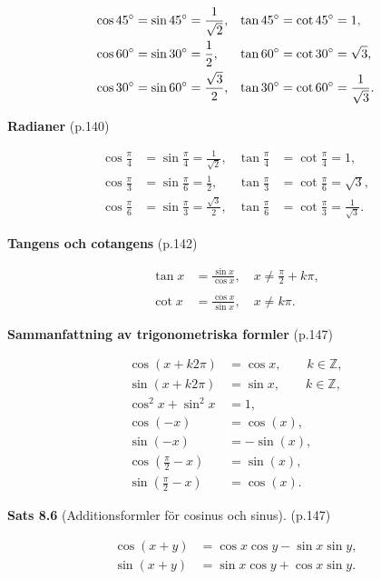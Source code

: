 \documentclass[11pt]{article}
\begin{document}
\begin{align}
    \cos 45\degree &= \sin 45\degree = \frac{1}{\sqrt{2}}, &\tan 45\degree &= \cot 45\degree = 1,\\
    \cos 60\degree &= \sin 30\degree = \frac{1}{2},        &\tan 60\degree &= \cot 30\degree = \sqrt{3},\\
    \cos 30\degree &= \sin 60\degree = \frac{\sqrt{3}}{2}, &\tan 30\degree &= \cot 60\degree = \frac{1}{\sqrt{3}}.
\end{align}

\textbf{Radianer} (p.140)

\begin{align}
    \cos \frac{\pi}{4} &= \sin \frac{\pi}{4} = \frac{1}{\sqrt{2}}, &\tan \frac{\pi}{4} &= \cot \frac{\pi}{4} = 1,\\
    \cos \frac{\pi}{3} &= \sin \frac{\pi}{6} = \frac{1}{2},        &\tan \frac{\pi}{3} &= \cot \frac{\pi}{6} = \sqrt{3},\\
    \cos \frac{\pi}{6} &= \sin \frac{\pi}{3} = \frac{\sqrt{3}}{2}, &\tan \frac{\pi}{6} &= \cot \frac{\pi}{3} = \frac{1}{\sqrt{3}}.
\end{align}

\textbf{Tangens och cotangens} (p.142)

\begin{align}
    \tan x &= \frac{\sin x}{\cos x}, \quad x \neq \frac{\pi}{2} + k\pi,\\
    \nonumber \\
    \cot x &= \frac{\cos x}{\sin x}, \quad x \neq k\pi.
\end{align}

\textbf{Sammanfattning av trigonometriska formler} (p.147)

\begin{align}
    \cos(x + k2\pi) &= \cos x, \qquad k \in \mathbb{Z},\\
    \sin(x + k2\pi) &= \sin x, \qquad k \in \mathbb{Z},\\
    \cos^2 x + \sin^2 x &= 1,\\
    \cos(-x) &= \cos(x),\\
    \sin(-x) &= -\sin(x),\\
    \cos\left(\frac{\pi}{2} - x\right) &= \sin(x),\\
    \sin\left(\frac{\pi}{2} - x\right) &= \cos(x).
\end{align}

\textbf{Sats 8.6} (Additionsformler för cosinus och sinus). (p.147)

\begin{align}
    \cos(x + y) &= \cos x \cos y - \sin x \sin y,\\
    \sin(x + y) &= \sin x \cos y + \cos x \sin y.
\end{align}
\end{document}
